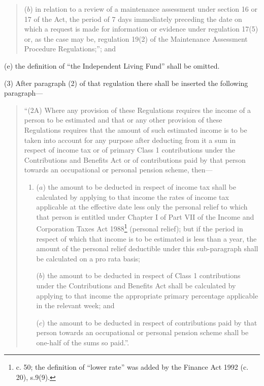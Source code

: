 \documentclass[a4paper]{article}
\begin{document}
\begin{enumerate}
\begin{quotation}
\begin{enumerate}
($b$) in relation to a review of a maintenance assessment under section 16 or 17 of the Act, the period of 7 days immediately preceding the date on which a request is made for information or evidence under regulation 17(5) or, as the case may be, regulation 19(2) of the Maintenance Assessment Procedure Regulations;”; and
\end{enumerate}
\end{quotation}

(e) the definition of “the Independent Living Fund” shall be omitted.
\end{enumerate}

(3) After paragraph (2) of that regulation there shall be inserted the following paragraph---
\begin{quotation}
“(2A) Where any provision of these Regulations requires the income of a person to be estimated and that or any other provision of these Regulations requires that the amount of such estimated income is to be taken into account for any purpose after deducting from it a sum in respect of income tax or of primary Class 1 contributions under the Contributions and Benefits Act or of contributions paid by that person towards an occupational or personal pension scheme, then---
\begin{enumerate}\item[]
($a$) the amount to be deducted in respect of income tax shall be calculated by applying to that income the rates of income tax applicable at the effective date less only the personal relief to which that person is entitled under Chapter I of Part VII of the Income and Corporation Taxes Act 1988\footnote{ c. 50; the definition of “lower rate” was added by the Finance Act 1992 (c. 20), s.9(9).} (personal relief); but if the period in respect of which that income is to be estimated is less than a year, the amount of the personal relief deductible under this sub-paragraph shall be calculated on a pro rata basis;

($b$) the amount to be deducted in respect of Class 1 contributions under the Contributions and Benefits Act shall be calculated by applying to that income the appropriate primary percentage applicable in the relevant week; and

($c$) the amount to be deducted in respect of contributions paid by that person towards an occupational or personal pension scheme shall be one-half of the sums so paid.”.
\end{enumerate}
\end{quotation}
\end{document}
